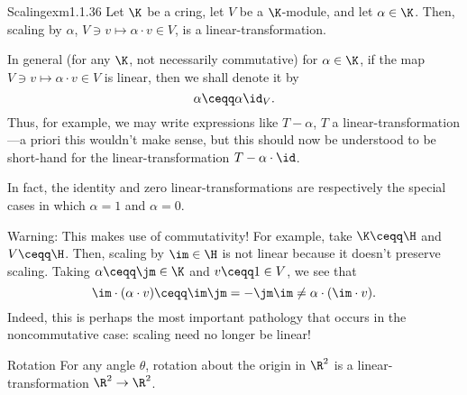 \begin{exm}{Scaling}{exm1.1.36}
	Let $\K$ be a cring, let $V$ be a $\K$-module, and let $\alpha \in \K$.  Then, scaling by $\alpha$, $V\ni v\mapsto \alpha \cdot v\in V$, is a linear-transformation.
	\begin{ntn}
		In general (for any $\K$, not necessarily commutative) for $\alpha \in \K$, if the map $V\ni v\mapsto \alpha \cdot v\in V$ is linear, then we shall denote it by
		\begin{equation}
			\alpha \ceqq \alpha \id _V.
		\end{equation}
		Thus, for example, we may write expressions like $T-\alpha$, $T$ a linear-transformation---a priori this wouldn't make sense, but this should now be understood to be short-hand for the linear-transformation $T-\alpha \cdot \id$.
	\end{ntn}
	\begin{rmk}
		In fact, the identity and zero linear-transformations are respectively the special cases in which $\alpha =1$ and $\alpha =0$.
	\end{rmk}
	\begin{rmk}
		Warning:  This makes use of commutativity!  For example, take $\K \ceqq \H$ and $V\ceqq \H$.  Then, scaling by $\im \in \H$ is not linear because it doesn't preserve scaling.  Taking $\alpha \ceqq \jm \in \K$ and $v\ceqq 1\in V$, we see that
		\begin{equation}
			\im \cdot (\alpha \cdot v)\ceqq \im \jm =-\jm \im \neq \alpha \cdot (\im \cdot v).
		\end{equation}
		Indeed, this is perhaps the most important pathology that occurs in the noncommutative case:  scaling need no longer be linear!
	\end{rmk}
\end{exm}
\begin{exm}{Rotation}{}
	For any angle $\theta$, rotation about the origin in $\R ^2$ is a linear-transformation $\R ^2\rightarrow \R ^2$.
\end{exm}
